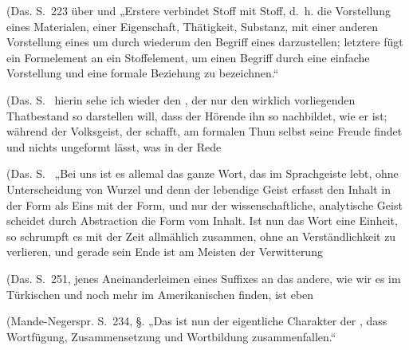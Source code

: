 \label{fp.324}

(Das. S.~223 über  und  „Erstere verbindet Stoff mit Stoff, d.~h. die Vorstellung eines Materialen, einer Eigenschaft, Thätigkeit, Substanz, mit einer anderen Vorstellung eines  um durch  wiederum den Begriff eines  darzustellen; letztere fügt ein Formelement an ein Stoffelement, um einen Begriff durch eine einfache Vorstellung und eine formale Beziehung zu bezeichnen.“

(Das. S.~  hierin sehe ich wieder den , der nur den wirklich vorliegenden Thatbestand so darstellen will, dass der Hörende ihn so nachbildet, wie er ist; während der Volksgeist, der  schafft, am formalen Thun selbst seine Freude findet und nichts ungeformt lässt, was in der Rede 

(Das. S.~ „Bei uns ist es allemal das ganze Wort, das im Sprachgeiste lebt, ohne Unterscheidung von Wurzel und  denn der lebendige Geist erfasst den Inhalt in der Form als Eins mit der Form, und nur der wissenschaftliche, analytische Geist scheidet durch Abstraction die Form vom Inhalt. Ist nun das Wort eine Einheit, so schrumpft es mit der Zeit allmählich zusammen, ohne an Verständlichkeit zu verlieren, und gerade sein Ende ist am Meisten der Verwitterung 

(Das. S.~251,    jenes Aneinanderleimen eines Suffixes an das andere, wie wir es im Türkischen und noch mehr im Amerikanischen finden, ist eben  

(Mande-Negerspr. S.~234, §.  „Das ist nun der eigentliche Charakter der , dass Wortfügung, Zusammensetzung und Wortbildung zusammenfallen.“

